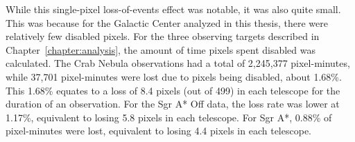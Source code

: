 
%
% 
%

While this single-pixel loss-of-events effect was notable, it was also quite small.
This was because for the Galactic Center analyzed in this thesis, there were relatively few disabled pixels.
For the three observing targets described in Chapter~\ref{chapter:analysis}, the amount of time pixels spent disabled was calculated.
The Crab Nebula observations had a total of 2,245,377 pixel-minutes, while 37,701 pixel-minutes were lost due to pixels being disabled, about 1.68\%.
This 1.68\% equates to a loss of 8.4 pixels (out of 499) in each telescope for the duration of an observation.
For the Sgr A* Off data, the loss rate was lower at 1.17\%, equivalent to losing 5.8 pixels in each telescope.
For Sgr A*, 0.88\% of pixel-minutes were lost, equivalent to losing 4.4 pixels in each telescope.

